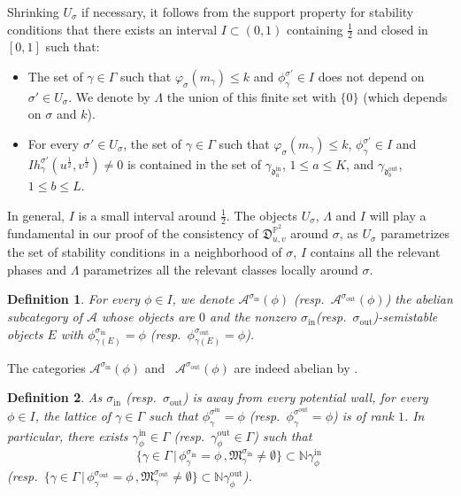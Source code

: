 \documentclass[12pt, a4paper]{amsart}
\newtheorem{defn}{Definition}[section]
\newcommand\NN{\mathbb N}
\newcommand\PP{\mathbb P}
\newcommand\cA{\mathcal A}
\newcommand\fd{\mathfrak d}
\newcommand\fD{\mathfrak D}
\newcommand\fM{\mathfrak M}
\newcommand\iin{\mathrm{in}}
\newcommand\oout{\mathrm{out}}
\begin{document}
Shrinking $U_\sigma$ if necessary, it follows from the support property for stability conditions that there exists an interval $I \subset (0,1)$ containing $\frac{1}{2}$
and closed in $[0,1]$ such that:
\begin{itemize}
    \item[(i)] The set of $\gamma \in \Gamma$
such that $\varphi_{\sigma}(m_\gamma) \leqslant k$ 
and $\phi^{\sigma'}_\gamma \in I$
does not depend on $\sigma' \in U_\sigma$.
We denote by $\Lambda$ the union of this finite set with $\{0\}$
(which depends on $\sigma$ and $k$).
    \item[(ii)]  For every 
$\sigma' \in U_\sigma$, 
the set of $\gamma \in \Gamma$
such that $\varphi_{\sigma}(m_\gamma) \leqslant k$, $\phi^{\sigma'}_\gamma \in I$
and $Ih_\gamma^{\sigma'}(u^{\frac{1}{2}}, v^{\frac{1}{2}}) \neq 0$ is contained in the set of 
$\gamma_{\fd_a^{\iin}}$, $1 \leqslant a 
\leqslant K$,
and $\gamma_{\fd_b^{\oout}}$, $1 \leqslant b\leqslant L$.
\end{itemize}
In general, $I$ is a small interval around $\frac{1}{2}$.
The objects $U_\sigma$, $\Lambda$ and $I$ will play a fundamental in our proof
of the consistency of $\fD_{u,v}^{\PP^2}$ around $\sigma$, as 
$U_\sigma$ parametrizes the set of stability conditions in a neighborhood of $\sigma$, $I$ contains all the relevant phases
and $\Lambda$ parametrizes all the relevant classes locally around $\sigma$.

\begin{defn}For every $\phi \in I$, we denote 
$\cA^{\sigma_{\iin}}(\phi)$ (resp.\ $\cA^{\sigma_{\oout}}(\phi)$) the abelian subcategory of
$\cA$ whose objects are $0$ and the 
nonzero $\sigma_{\iin}$(resp.\ $\sigma_{\oout}$)-semistable objects $E$
 with 
$\phi_{\gamma(E)}^{\sigma_\iin}= \phi$ (resp.\ $\phi_{\gamma(E)}^{\sigma_\oout}= \phi$).
\end{defn}


The categories $\cA^{\sigma_{\iin}}(\phi)$ and \ $\cA^{\sigma_{\oout}}(\phi)$
are indeed abelian by \cite[Lemma 5.2]{MR2373143}.

\begin{defn}
As $\sigma_\iin$ (resp.\ 
$\sigma_\oout$) is away from every 
potential wall, for every $\phi \in I$, the lattice of 
$\gamma \in \Gamma$ such that $\phi_\gamma^{\sigma^\iin}=\phi$
(resp.\ $\phi_\gamma^{\sigma^\oout}=\phi$) is of rank $1$. In particular, there exists $\gamma^\iin_\phi \in \Gamma$
(resp.\ $\gamma^\oout_\phi \in \Gamma$) such that 
\[ \{ \gamma \in \Gamma\,|\,
\phi_\gamma^{\sigma_\iin}=\phi \,,
\fM_\gamma^{\sigma_\iin} \neq \emptyset\}
\subset \NN \gamma^\iin_\phi \,\]
(resp.\ $\{ \gamma \in \Gamma\,|\,
\phi_\gamma^{\sigma_\oout}=\phi \,,
\fM_\gamma^{\sigma_\oout} \neq \emptyset \}
\subset \NN \gamma^\oout_\phi$).
\end{defn}
\end{document}
